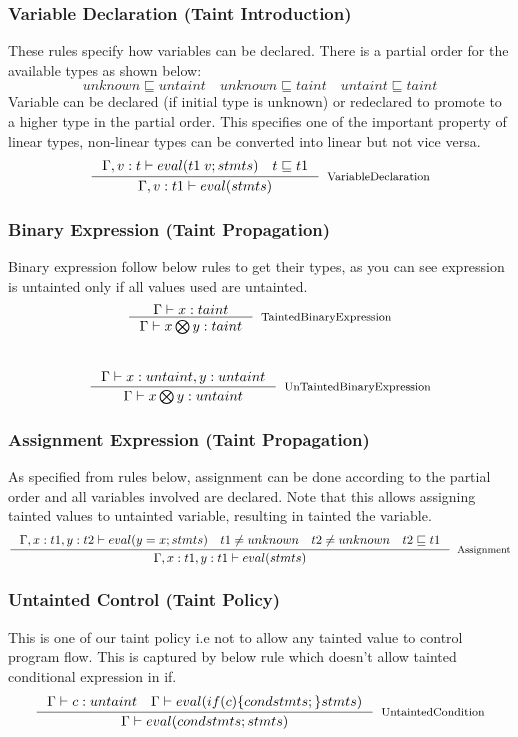 \documentclass[11pt, pdftex]{article}
\begin{document}
\subsubsection{Variable Declaration (Taint Introduction)}
These rules specify how variables can be declared. There is a partial order for the available types as shown below:
$$ unknown \sqsubseteq untaint \quad unknown \sqsubseteq taint \quad untaint \sqsubseteq taint $$
Variable can be declared (if initial type is unknown) or redeclared to promote to a higher type in the partial order. This specifies one of the important property of linear types, non-linear types can be converted into linear but not vice versa.
$$ \inference {\Gamma ,v:t \vdash eval(t1 \; v;stmts) \quad t \sqsubseteq t1}{\Gamma , v:t1 \vdash eval(stmts)}[VariableDeclaration]$$
\subsubsection{Binary Expression (Taint Propagation)}
Binary expression follow below rules to get their types, as you can see expression is untainted only if all values used are  untainted.
$$ \inference {\Gamma \vdash x:taint}{\Gamma \vdash x \bigotimes y:taint}[TaintedBinaryExpression]$$
\\
$$ \inference {\Gamma \vdash x:untaint, y:untaint}{\Gamma \vdash x \bigotimes y:untaint}[UnTaintedBinaryExpression]$$
\subsubsection{Assignment Expression (Taint Propagation)}
As specified from rules below, assignment can be done according to the partial order and all variables involved are declared. Note that this allows assigning tainted values to untainted variable, resulting in tainted the variable.
$$ \inference {\Gamma , x:t1 , y:t2 \vdash eval(y=x;stmts) \quad t1 \neq unknown \quad t2 \neq unknown \quad t2 \sqsubseteq t1}{\Gamma , x:t1 , y:t1 \vdash eval(stmts)}[Assignment]$$
\subsubsection{Untainted Control (Taint Policy)}
This is one of our taint policy i.e not to allow any tainted value to control program flow. This is captured by below rule which doesn't allow tainted conditional expression in if.
$$ \inference {\Gamma \vdash c:untaint \quad \Gamma \vdash eval(if(c) \{condstmts;\} stmts)}{\Gamma \vdash eval(condstmts;stmts)}[UntaintedCondition]$$
\end{document}
